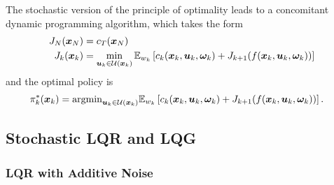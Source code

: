 The stochastic version of the principle of optimality leads to a concomitant dynamic programming algorithm, which takes the form
\begin{align}
    J_N(\bm{x}_N) &= c_T(\bm{x}_N)\\
    J_k(\bm{x}_k) &= \min_{\bm{u}_k \in \mathcal{U}(\bm{x}_k)} \mathbb{E}_{w_k} \left[ c_k(\bm{x}_k,\bm{u}_k,\bm{\omega}_k) + J_{k+1}(f(\bm{x}_k,\bm{u}_k,\bm{\omega}_k)) \right]
    \label{eq:DP_rec_stoch}
\end{align}
and the optimal policy is
\begin{align}
    \pi^*_k(\bm{x}_k) &= \text{argmin}_{\bm{u}_k \in \mathcal{U}(\bm{x}_k)} \mathbb{E}_{w_k} \left[ c_k(\bm{x}_k,\bm{u}_k,\bm{\omega}_k) + J_{k+1}(f(\bm{x}_k,\bm{u}_k,\bm{\omega}_k)) \right].
    \label{eq:DP_rec_stoch}
\end{align}

\subsection{Stochastic LQR and LQG}

\subsubsection{LQR with Additive Noise}

